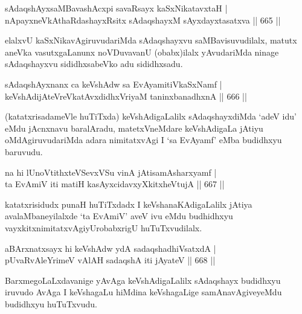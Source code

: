
\begin{shl}
sAdaqshAyxsaMBavashAcxpi savaRsayx kaSxNikatavxtaH | \\
nApayxneVkAthaRdashayxRsitx sAdaqshayxM sAyxdayxtasatxva \hfill||  665 ||  
\end{shl}

\begin{artha}
elalxvU kaSxNikavAgiruvudariMda sAdaqshayxvu saMBavisuvudilalx, matutx aneVka vasutxgaLanunx noVDuvavanU (obabx)ilalx yAvudariMda ninage sAdaqshayxvu sididhxsabeVko adu sididhxsadu.
\end{artha}


\begin{shl}
sAdaqshAyxnanx ca keVshAdw sa EvAyamitiVkaSxNamf | \\
keVshAdijAteVreVkatAvxdidhxVriyaM taninxbanadhxnA \hfill||  666 ||  
\end{shl}

\begin{artha}
(katatxrisadameVle huTiTxda) keVshAdigaLalilx sAdaqshayxdiMda `adeV idu' eMdu jAcnxnavu baralAradu, matetxVneMdare keVshAdigaLa jAtiyu oMdAgiruvudariMda adara nimitatxvAgi I `sa EvAyamf' eMba budidhxyu baruvudu.
\end{artha}

\begin{shl}
na hi lUnoVtithxteVSevxVSu vinA jAtisamAsharxyamf | \\
ta EvAmiV iti matiH kasAyxcidavxyXkitxheVtujA \hfill||  667 ||  
\end{shl}

\begin{artha}
katatxrisidudx punaH huTiTxdadx I keVshanaKAdigaLalilx jAtiya avalaMbaneyilalxde `ta EvAmiV' aveV ivu eMdu budhidhxyu vayxkitxnimitatxvAgiyUrobabxrigU huTuTxvudilalx.
\end{artha}

\begin{shl}
aBArxnatxsayx hi keVshAdw ydA sadaqshadhiVsatxdA | \\
pUvaRvAleYrimeV vAlAH sadaqshA iti jAyateV \hfill||  668 ||  
\end{shl}

\begin{artha}
BarxmegoLaLxdavanige yAvAga keVshAdigaLalilx sAdaqshayx budidhxyu iruvudo AvAga I keVshagaLu hiMdina keVshagaLige samAnavAgiveyeMdu budidhxyu huTuTxvudu.
\end{artha}

